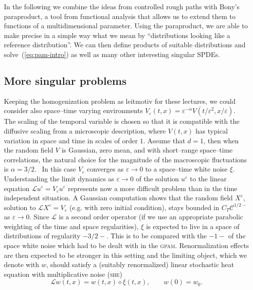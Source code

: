 \documentclass[a4paper,11pt]{article}
\newcommand{\tmname}[1]{\textsc{#1}}
\newcommand{\LL}{\mathscr{L}}
\newcommand{\CC}{\mathscr{C}}
\newcommand{\renorm}{\,\mathord{\diamond}\,}
\begin{document}
In the following we combine the ideas from controlled rough paths with Bony's
paraproduct, a tool from functional analysis that allows us to extend them to
functions of a multidimensional parameter. Using the paraproduct, we are able
to make precise in a simple way what we mean by ``distributions looking like a
reference distribution''. We can then define products of suitable
distributions and solve~(\ref{eq:pam-intro}) as well as many other interesting
singular SPDEs.

\subsection{More singular problems}\label{sec:rbe,kpz,she}

Keeping the homogenization problem as leitmotiv for these lectures, we could
consider also space--time varying environments $V_{\varepsilon} (t, x) =
\varepsilon^{- \alpha} V (t / \varepsilon^2, x / \varepsilon)$. The scaling of
the temporal variable is chosen so that it is compatible with the diffusive
scaling from a microscopic description, where $V (t, x)$ has typical variation
in space and time in scales of order $1$. Assume that $d = 1$, then when the
random field $V$ is Gaussian, zero mean, and with short--range space--time
correlations, the natural choice for the magnitude of the macroscopic
fluctuations is $\alpha = 3 / 2$. \ In this case $V_{\varepsilon}$ converges
as $\varepsilon \rightarrow 0$ to a space--time white noise $\xi$.
Understanding the limit dynamics as $\varepsilon \rightarrow 0$ of the
solution $u^{\varepsilon}$ to the linear equation $\LL u^{\varepsilon} =
V_{\varepsilon} u^{\varepsilon}$ represents now a more difficult problem than
in the time independent situation. A Gaussian computation shows that the
random field $X^{\varepsilon}$, solution to $\LL X^{\varepsilon} =
V_{\varepsilon}$ (e.g. with zero initial condition), stays bounded in $C_T
\CC^{1 / 2 -}$ as $\varepsilon \rightarrow 0$. Since $\LL$ is a second order
operator (if we use an appropriate parabolic weighting of the time and space
regularities), $\xi$ is expected to live in a space of distributions of
regularity $- 3 / 2 -$. This is to be compared with the $- 1 -$ of the space
white noise which had to be dealt with in the {\tmname{gpam}}. Renormalization
effects are then expected to be stronger in this setting and the limiting
object, which we denote with $w$, should satisfy a (suitably renormalized)
linear stochastic heat equation with multiplicative noise ({\tmname{she}})
\begin{equation}
  \label{eq:heat-intro} \LL w (t, x) = w (t, x) \renorm \xi (t, x),
  \hspace{2em} w (0) = w_0 .
\end{equation}
\end{document}
